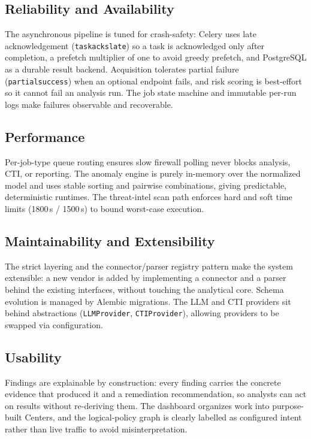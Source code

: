 \documentclass[12pt,a4paper]{report}
\renewcommand{\_}{\textunderscore\allowbreak}
\begin{document}
\subsection{Reliability and Availability}
\label{sec:ch3-nfr-reliability}
The asynchronous pipeline is tuned for crash-safety: Celery uses late acknowledgement (\texttt{task\_acks\_late}) so a task is acknowledged only after completion, a prefetch multiplier of one to avoid greedy prefetch, and PostgreSQL as a durable result backend. Acquisition tolerates partial failure (\texttt{partial\_success}) when an optional endpoint fails, and risk scoring is best-effort so it cannot fail an analysis run. The job state machine and immutable per-run logs make failures observable and recoverable.

\subsection{Performance}
\label{sec:ch3-nfr-performance}
Per-job-type queue routing ensures slow firewall polling never blocks analysis, CTI, or reporting. The anomaly engine is purely in-memory over the normalized model and uses stable sorting and pairwise combinations, giving predictable, deterministic runtimes. The threat-intel scan path enforces hard and soft time limits (1800\,s / 1500\,s) to bound worst-case execution.

\subsection{Maintainability and Extensibility}
\label{sec:ch3-nfr-maintainability}
The strict layering and the connector/parser registry pattern make the system extensible: a new vendor is added by implementing a connector and a parser behind the existing interfaces, without touching the analytical core. Schema evolution is managed by Alembic migrations. The LLM and CTI providers sit behind abstractions (\texttt{LLMProvider}, \texttt{CTIProvider}), allowing providers to be swapped via configuration.

\subsection{Usability}
\label{sec:ch3-nfr-usability}
Findings are explainable by construction: every finding carries the concrete evidence that produced it and a remediation recommendation, so analysts can act on results without re-deriving them. The dashboard organizes work into purpose-built Centers, and the logical-policy graph is clearly labelled as configured intent rather than live traffic to avoid misinterpretation.
\end{document}
